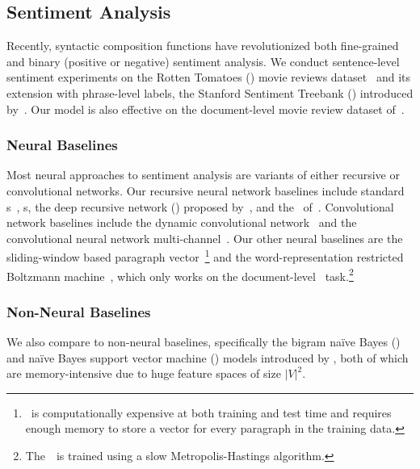 \subsection{Sentiment Analysis}\label{sec:sst}

Recently, syntactic composition functions have revolutionized both fine-grained
and binary (positive or negative) sentiment analysis. We conduct sentence-level
sentiment experiments on the Rotten Tomatoes () movie reviews
dataset~\cite{pang2005seeing} and its extension with phrase-level labels, the
Stanford Sentiment Treebank () introduced
by~. Our model is also effective on the
document-level  movie review dataset of~.

\subsubsection{Neural Baselines}

Most neural approaches to sentiment analysis are variants of either recursive or
convolutional networks. Our recursive neural network baselines include standard
\recnn s~\cite{SocherEtAl2011:RAE}, \rntn s, the deep recursive network
(\drnn) proposed by~, and the \tlstm\ of~\cite{taiacl15}. Convolutional network baselines
include the dynamic convolutional
network~\cite[\dcnn]{kalchbrenner2014convolutional} and the convolutional neural
network multi-channel~\cite[\cnnmc]{kim:2014:EMNLP2014}. Our other neural
baselines are the sliding-window based paragraph
vector~\cite[\pvec]{le2014distributed}\footnote{\pvec\ is computationally
  expensive at both training and test time and requires enough memory to store a
  vector for every paragraph in the training data.} and the word-representation
restricted Boltzmann machine~\cite[\wrrbm]{dahl2012training}, which only works
on the document-level~ task.\footnote{The~\wrrbm\ is trained using a
  slow Metropolis-Hastings algorithm.}

\subsubsection{Non-Neural Baselines}

We also compare to non-neural baselines, specifically the bigram na\"ive Bayes
(\binb) and na\"ive Bayes support vector machine (\nbsvm) models introduced by
, both of which are memory-intensive due to huge feature
spaces of size $|V|^2$.


